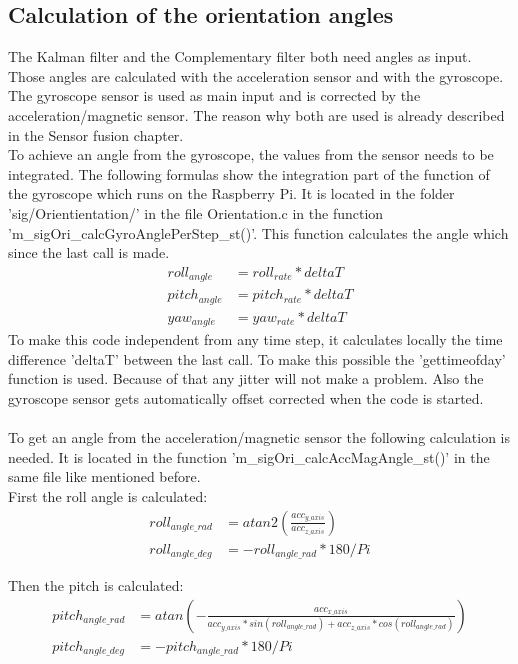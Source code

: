 \subsection{Calculation of the orientation angles}
\label{subsec:CalcAngle}
The Kalman filter and the Complementary filter both need angles as input. Those angles are calculated with the acceleration sensor and with the gyroscope. The gyroscope sensor is used as main input and is corrected by the acceleration/magnetic sensor. The reason why both are used is already described in the Sensor fusion chapter.\\
To achieve an angle from the gyroscope, the values from the sensor needs to be integrated. The following formulas show the integration part of the function of the gyroscope which runs on the Raspberry Pi. It is located in the folder 'sig/Orientientation/' in the file Orientation.c in the function 'm\_sigOri\_calcGyroAnglePerStep\_st()'. This function calculates the angle which since the last call is made.
\begin{align}
roll_{angle}&=roll_{rate}*deltaT\\
pitch_{angle}&=pitch_{rate}*deltaT\\
yaw_{angle}&=yaw_{rate}*deltaT
\end{align}
To make this code independent from any time step, it calculates locally the time difference 'deltaT' between the last call. To make this possible the 'gettimeofday' function is used. Because of that any jitter will not make a problem. Also the gyroscope sensor gets automatically offset corrected when the code is started.\\\\
To get an angle from the acceleration/magnetic sensor the following calculation is needed. It is located in the function 'm\_sigOri\_calcAccMagAngle\_st()' in the same file like mentioned before.\\
First the roll angle is calculated:
\begin{align}
roll_{angle\_rad}&=atan2\left(\frac{acc_{y\_axis}}{acc_{z\_axis}}\right)\\
		roll_{angle\_deg}&=-roll_{angle\_rad}*180/Pi
\end{align}

Then the pitch is calculated:
\begin{align}
pitch_{angle\_rad}&=atan\left(-\frac{acc_{x\_axis}}{acc_{y\_axis}*sin(roll_{angle\_rad})+acc_{z\_axis}*cos(roll_{angle\_rad})}\right)\\
pitch_{angle\_deg}&=-pitch_{angle\_rad}*180/Pi
\end{align}

